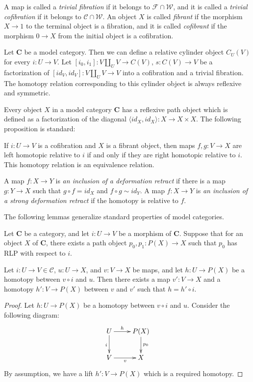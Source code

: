 \documentclass[reqno]{amsart}
\theoremstyle{definition}
\newcommand{\we}{\mathcal{W}}
\newcommand{\fib}{\mathcal{F}}
\newcommand{\cof}{\mathcal{C}}
\newcommand{\cat}[1]{\mathbf{#1}}
\newcommand{\C}{\cat{C}}
\newcommand{\cyli}{i}
\begin{document}
A map is called a \emph{trivial fibration} if it belongs to $\fib \cap \we$,
and it is called a \emph{trivial cofibration} if it belongs to $\cof \cap \we$.
An object $X$ is called \emph{fibrant} if the morphism $X \to 1$ to the terminal object is a fibration,
and it is called \emph{cofibrant} if the morphism $0 \to X$ from the initial object is a cofibration.

Let $\C$ be a model category.
Then we can define a relative cylinder object $C_U(V)$ for every $i : U \to V$.
Let $[\cyli_0,\cyli_1] : V \amalg_U V \to C(V)$, $s : C(V) \to V$ be a factorization of $[id_V,id_V] : V \amalg_U V \to V$ into a cofibration and a trivial fibration.
The homotopy relation corresponding to this cylinder object is always reflexive and symmetric.

Every object $X$ in a model category $\C$ has a reflexive path object which is defined as a factorization of the diagonal $\langle id_X, id_X \rangle : X \to X \times X$.
The following proposition is standard:
\begin{prop}
If $i : U \to V$ is a cofibration and $X$ is a fibrant object, then maps $f,g : V \to X$ are left homotopic relative to $i$ if and only if they are right homotopic relative to $i$.
This homotopy relation is an equivalence relation.
\end{prop}

A map $f : X \to Y$ is \emph{an inclusion of a deformation retract} if there is
a map $g : Y \to X$ such that $g \circ f = id_X$ and $f \circ g \sim id_Y$.
A map $f : X \to Y$ is \emph{an inclusion of a strong deformation retract} if the homotopy is relative to $f$.

The following lemmas generalize standard properties of model categories.

\begin{lem}
Let $\C$ be a category, and let $i : U \to V$ be a morphism of $\C$.
Suppose that for an object $X$ of $\C$, there exists a path object $p_0,p_1 : P(X) \to X$ such that $p_0$ has RLP with respect to $i$.

Let $i : U \to V \in \cof$, $u : U \to X$, and $v : V \to X$ be maps, and let $h : U \to P(X)$ be a homotopy between $v \circ i$ and $u$.
Then there exists a map $v' : V \to X$ and a homotopy $h' : V \to P(X)$ between $v$ and $v'$ such that $h = h' \circ i$.
\end{lem}
\begin{proof}
Let $h : U \to P(X)$ be a homotopy between $v \circ i$ and $u$.
Consider the following diagram:
\[ \xymatrix{ U \ar[r]^-h \ar[d]_i & P(X) \ar[d]^{p_0} \\
              V \ar[r]_v & X
            } \]
By assumption, we have a lift $h' : V \to P(X)$ which is a required homotopy.
\end{proof}
\end{document}
